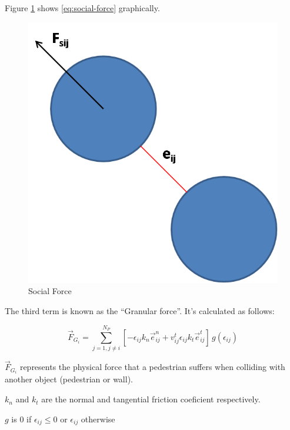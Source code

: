 \documentclass[draftclsnofoot]{IEEEtran}
\begin{document}
Figure \ref{fig:Social-Force} shows \ref{eq:social-force} graphically.

\begin{figure}[h]
    \begin{centering}
    \includegraphics[scale=0.4]{pics/sfm/sf} 
    \par
    \end{centering}
    \caption{Social Force\label{fig:Social-Force}}
\end{figure}

The third term is known as the ``Granular force''. It's calculated
as follows:

\begin{equation}
    \vec{F}_{G_{i}}=\sum_{j=1,j\ne i}^{N_{P}}[-\epsilon_{ij}k_{n}\vec{e}_{ij}^{n}+v_{ij}^{t}\epsilon_{ij}k_{t}\vec{e}_{ij}^{t}]\, g(\epsilon_{ij})\label{eq:granular-force}
\end{equation}


$\vec{F}_{G_{i}}$ represents the physical force that a pedestrian
suffers when colliding with another object (pedestrian or wall).

$k_{n}$ and $k_{t}$ are the normal and tangential friction coeficient
respectively.

$g$ is $0$ if $\epsilon_{ij} \leq 0$  or $\epsilon_{ij}$ otherwise\\
\end{document}
